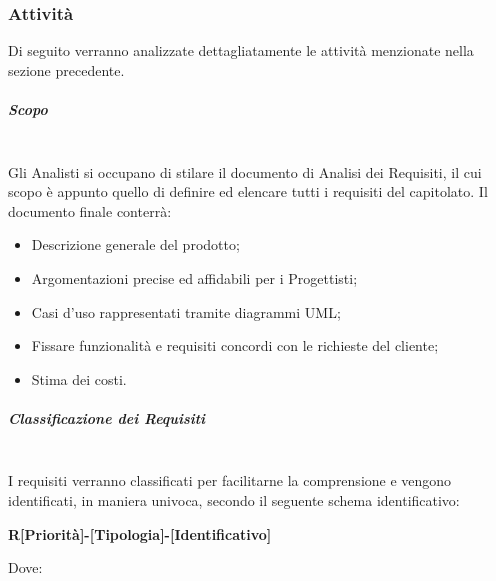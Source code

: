 		\subsubsection{Attività}
			Di seguito verranno analizzate dettagliatamente le attività menzionate nella sezione precedente.
				\subparagraph{Scopo \\  \\}
					Gli Analisti si occupano di stilare il documento di Analisi dei Requisiti, il cui scopo è appunto quello di definire ed elencare tutti i requisiti del capitolato. Il documento finale conterrà:
					\begin{itemize}
						\item Descrizione generale del prodotto;
						\item Argomentazioni precise ed affidabili per i Progettisti;
						\item Casi d'uso rappresentati tramite diagrammi UML;
						\item Fissare funzionalità e requisiti concordi con le richieste del cliente;
						\item Stima dei costi.
					\end{itemize}
				\subparagraph{Classificazione dei Requisiti \\ \\}
					I requisiti verranno classificati per facilitarne la comprensione e vengono identificati, in maniera univoca, secondo il seguente schema identificativo:
					\begin{center}
						\textbf{R[Priorità]-[Tipologia]-[Identificativo]}
					\end{center}
					Dove:
